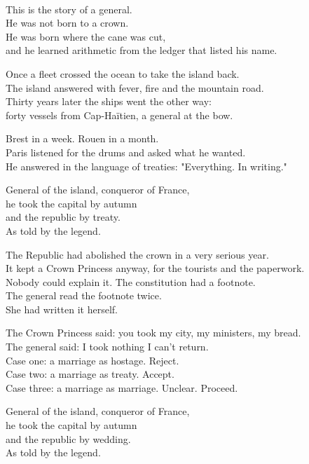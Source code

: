 \begin{lyrics}
\\
This is the story of a general.\\
He was not born to a crown.\\
He was born where the cane was cut,\\
and he learned arithmetic from the ledger that listed his name.

Once a fleet crossed the ocean to take the island back.\\
The island answered with fever, fire and the mountain road.\\
Thirty years later the ships went the other way:\\
forty vessels from Cap-Haïtien, a general at the bow.

Brest in a week. Rouen in a month.\\
Paris listened for the drums and asked what he wanted.\\
He answered in the language of treaties:
"Everything. In writing."

General of the island, conqueror of France,\\
he took the capital by autumn\\
and the republic by treaty.\\
As told by the legend.

The Republic had abolished the crown in a very serious year.\\
It kept a Crown Princess anyway, for the tourists and the paperwork.\\
Nobody could explain it. The constitution had a footnote.\\
The general read the footnote twice.\\
She had written it herself.

The Crown Princess said: you took my city, my ministers, my bread.\\
The general said: I took nothing I can't return.\\
Case one: a marriage as hostage. Reject.\\
Case two: a marriage as treaty. Accept.\\
Case three: a marriage as marriage. Unclear. Proceed.

General of the island, conqueror of France,\\
he took the capital by autumn\\
and the republic by wedding.\\
As told by the legend.


\end{lyrics}
